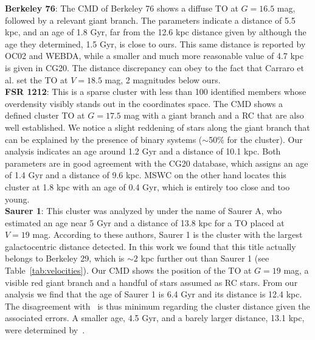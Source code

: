 \documentclass[draft]{aa}
\begin{document}
  \textbf{Berkeley 76}: The CMD of Berkeley 76 shows a diffuse TO at $G=16.5$
  mag, followed by a relevant giant branch. The parameters indicate a distance
  of 5.5 kpc, and an age of 1.8 Gyr, far from the 12.6 kpc distance given
  by \cite{Carraro_2013_Five} although the age they determined, 1.5 Gyr, is
  close to ours. This same distance is reported by OC02 and WEBDA, while a
  smaller and much more reasonable value of 4.7 kpc is given in CG20.
  The distance discrepancy can obey to the fact that Carraro et al. set
  the TO at $V=18.5$ mag, 2 magnitudes below ours.\\

  \textbf{FSR 1212}: This is a sparse cluster with less than 100 identified 
  members whose overdensity visibly stands out in the coordinates space. The CMD
  shows a defined cluster TO at $G=17.5$ mag with a giant branch and a RC that
  are also well established. We notice a slight reddening of stars along the
  giant branch that can be explained by the presence of binary systems 
  ($\sim$50\% for the cluster).
  Our analysis indicates an age around 1.2 Gyr and a distance of 10.1
  kpc. Both parameters are in good agreement with the CG20 database, which
  assigns an age of 1.4 Gyr and a distance of 9.6 kpc. MSWC on the other hand
  locates this cluster at 1.8 kpc with an age of 0.4 Gyr, which is entirely too
  close and too young.\\

  \textbf{Saurer 1}: This cluster was analyzed by \cite{Carraro_2003} under
  the name of Saurer A, who estimated an age near 5 Gyr and a distance of 13.8
  kpc for a TO placed at $V=19$ mag. According to these authors, Saurer 1 is the
  cluster with the largest galactocentric distance detected. In this work we
  found that this title actually belongs to Berkeley 29, which is $\sim2$
  kpc further out than Saurer 1 (see Table~\ref{tab:velocities}).
  Our CMD shows the position of the TO at $G=19$ mag, a visible red giant
  branch and a handful of stars assumed as RC stars. From our analysis we find
  that the age of Saurer 1 is 6.4 Gyr and its distance is 12.4 kpc. The
  disagreement with~\cite{Carraro_2003} is thus minimum regarding the
  cluster distance given the associated errors. A smaller age, 4.5 Gyr, and
  a barely larger distance, 13.1 kpc, were determined
  by~\cite{Frinchaboy_2006}.\\
\end{document}
